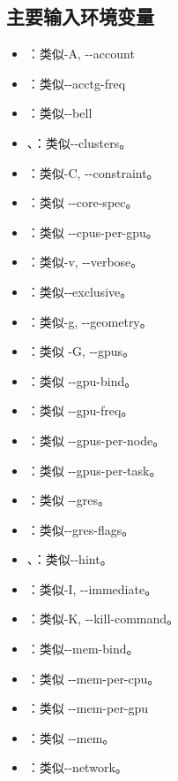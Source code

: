 \subsection{主要输入环境变量}
\begin{itemize}
	\item {}：类似-A, -{}-account
	\item {}：类似-{}-acctg-freq
	\item {}：类似-{}-bell
	\item {}、：类似-{}-clusters。
	\item {}：类似-C, -{}-constraint。
	\item {}：类似 -{}-core-spec。
	\item {}：类似 -{}-cpus-per-gpu。
	\item {}：类似-v, -{}-verbose。
	\item {}：类似-{}-exclusive。
	\item {}：类似-g, -{}-geometry。
	\item {}：类似 -G, -{}-gpus。
	\item {}：类似 -{}-gpu-bind。
	\item {}：类似 -{}-gpu-freq。
	\item {}：类似 -{}-gpus-per-node。
	\item {}：类似 -{}-gpus-per-task。
	\item {}：类似 -{}-gres。
	\item {}：类似-{}-gres-flags。
	\item {}、：类似-{}-hint。
	\item {}：类似-I, -{}-immediate。
	\item {}：类似-K, -{}-kill-command。
	\item {}：类似-{}-mem-bind。
	\item {}：类似 -{}-mem-per-cpu。
	\item {}：类似 -{}-mem-per-gpu
	\item {}：类似 -{}-mem。
	\item {}：类似-{}-network。

\end{itemize}
